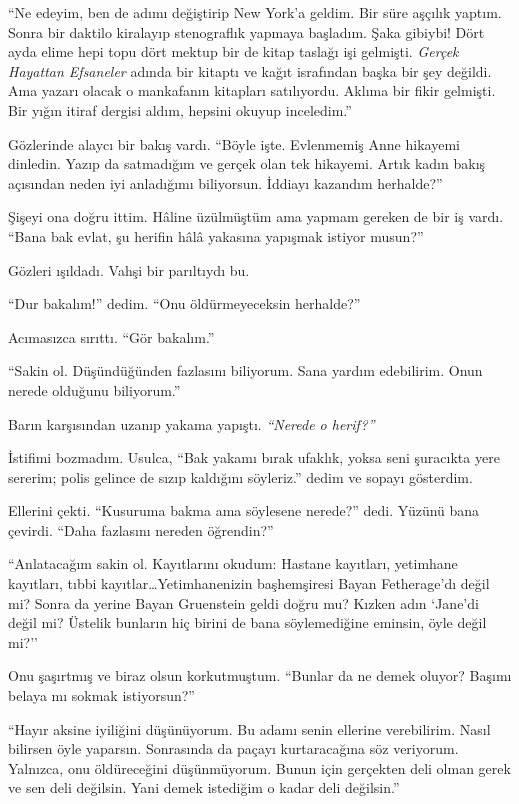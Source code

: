``Ne edeyim, ben de adımı değiştirip New York'a geldim. Bir süre aşçılık yaptım.
Sonra bir daktilo kiralayıp stenograflık yapmaya başladım. Şaka gibiybi! Dört
ayda elime hepi topu dört mektup bir de kitap taslağı işi gelmişti. \emph{Gerçek
Hayattan Efsaneler} adında bir kitaptı ve kağıt israfından başka bir şey değildi.
Ama yazarı olacak o mankafanın kitapları satılıyordu. Aklıma bir fikir gelmişti.
Bir yığın itiraf dergisi aldım, hepsini okuyup inceledim.''

Gözlerinde alaycı bir bakış vardı. ``Böyle işte. Evlenmemiş Anne hikayemi
dinledin. Yazıp da satmadığım ve gerçek olan tek hikayemi. Artık kadın bakış
açısından neden iyi anladığımı biliyorsun. İddiayı kazandım herhalde?''

Şişeyi ona doğru ittim. Hâline üzülmüştüm ama yapmam gereken de bir iş vardı.
``Bana bak evlat, şu herifin hâlâ yakasına yapışmak istiyor musun?''

Gözleri ışıldadı. Vahşi bir parıltıydı bu.

``Dur bakalım!'' dedim. ``Onu öldürmeyeceksin herhalde?''

Acımasızca sırıttı. ``Gör bakalım.''

``Sakin ol. Düşündüğünden fazlasını biliyorum. Sana yardım edebilirim. Onun
nerede olduğunu biliyorum.''

Barın karşısından uzanıp yakama yapıştı. \emph{``Nerede o herif?''}

İstifimi bozmadım. Usulca, ``Bak yakamı bırak ufaklık, yoksa seni şuracıkta yere
sererim; polis gelince de sızıp kaldığını söyleriz.'' dedim ve sopayı gösterdim.

Ellerini çekti. ``Kusuruma bakma ama söylesene nerede?'' dedi. Yüzünü bana
çevirdi. ``Daha fazlasını nereden öğrendin?''

``Anlatacağım sakin ol. Kayıtlarını okudum: Hastane kayıtları, yetimhane
kayıtları, tıbbi kayıtlar\dots Yetimhanenizin başhemşiresi Bayan Fetherage'dı
değil mi? Sonra da yerine Bayan Gruenstein geldi doğru mu? Kızken adın `Jane'di
değil mi? Üstelik bunların hiç birini de bana söylemediğine eminsin, öyle değil
mi?''

Onu şaşırtmış ve biraz olsun korkutmuştum. ``Bunlar da ne demek oluyor? Başımı
belaya mı sokmak istiyorsun?''

``Hayır aksine iyiliğini düşünüyorum. Bu adamı senin ellerine verebilirim. Nasıl
bilirsen öyle yaparsın. Sonrasında da paçayı kurtaracağına söz veriyorum.
Yalnızca, onu öldüreceğini düşünmüyorum. Bunun için gerçekten deli olman gerek
ve sen deli değilsin. Yani demek istediğim o kadar deli değilsin.''

